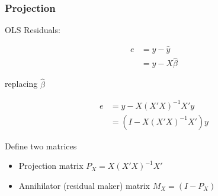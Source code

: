 \documentclass[
  shownotes,
  xcolor={svgnames},
  hyperref={colorlinks,citecolor=DarkBlue,linkcolor=DarkRed,urlcolor=DarkBlue}
  ]{beamer}
\begin{document}
\begin{frame}
\frametitle{Projection}

OLS Residuals:

\begin{align}
e &=y-\hat y \\
 &=y-X\hat\beta 
\end{align}

replacing $\hat \beta $

\begin{align}
e &= y- X(X'X)^{-1}X'y \\
  &= (I- X(X'X)^{-1}X')y
\end{align}

Define two matrices

\begin{itemize}
\item Projection matrix $P_X=X(X'X)^{-1}X'$ 
\item Annihilator (residual maker) matrix $M_X=(I-P_X)$
\end{itemize}


\end{frame}
\end{document}

